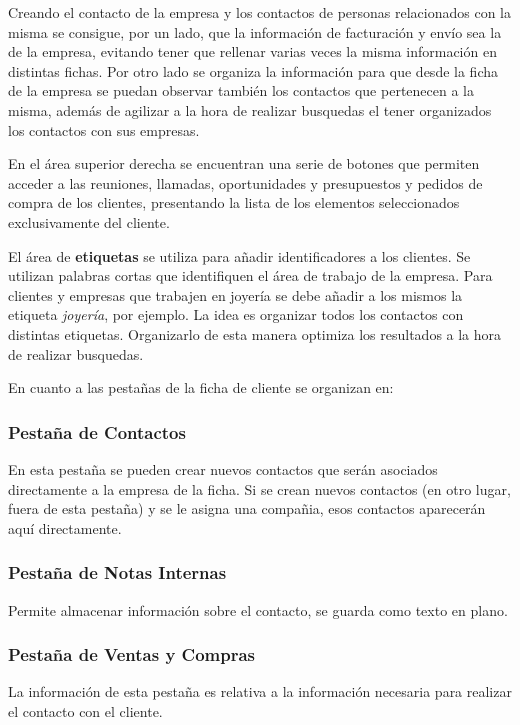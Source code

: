 Creando el contacto de la empresa y los contactos de personas relacionados con la misma
se consigue, por un lado, que la información de facturación y envío sea la de la empresa, 
evitando tener que rellenar varias veces la misma información en distintas fichas. Por otro
lado se organiza la información para que desde la ficha de la empresa se puedan observar también
los contactos que pertenecen a la misma, además de agilizar a la hora de realizar busquedas
el tener organizados los contactos con sus empresas.

En el área superior derecha se encuentran una serie de botones que permiten acceder a las reuniones, llamadas,
oportunidades y presupuestos y pedidos de compra de los clientes, presentando la lista de los elementos seleccionados
exclusivamente del cliente.

El área de \textbf{etiquetas} se utiliza para añadir identificadores a los clientes. Se utilizan
palabras cortas que identifiquen el área de trabajo de la empresa. Para clientes y empresas
que trabajen en joyería se debe añadir a los mismos la etiqueta \emph{joyería}, por ejemplo. La idea
es organizar todos los contactos con distintas etiquetas. Organizarlo de esta manera
optimiza los resultados a la hora de realizar busquedas.

En cuanto a las pestañas de la ficha de cliente se organizan en:

\subsubsection{Pestaña de Contactos}
En esta pestaña se pueden crear nuevos contactos que serán asociados directamente a la
empresa de la ficha. Si se crean nuevos contactos (en otro lugar, fuera de esta pestaña)
y se le asigna una compañia, esos contactos aparecerán aquí directamente.


\subsubsection{Pestaña de Notas Internas}
Permite almacenar información sobre el contacto, se guarda como texto en plano.


\subsubsection{Pestaña de Ventas y Compras}
La información de esta pestaña es relativa a la información necesaria para realizar el contacto
con el cliente.


